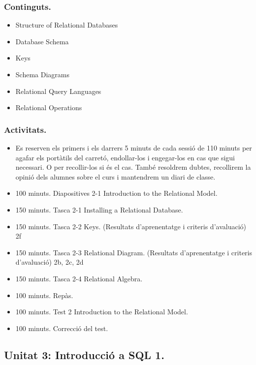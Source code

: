 \documentclass[catalan, a4paper, 12pt, titlepage]{article}
\begin{document}
  \subsubsection{Continguts.}

  \begin{itemize}
	  \item Structure of Relational Databases
	  \item Database Schema
	  \item Keys
	  \item Schema Diagrams
	  \item Relational Query Languages
	  \item Relational Operations
  \end{itemize}

  \subsubsection{Activitats.}

  \begin{itemize}
          \item Es reserven els primers i els darrers 5 minuts de cada sessió de 110 minuts per agafar els portàtils del carretó, endollar-los i engegar-los en cas que sigui necessari. O per recollir-los si és el cas. També resoldrem dubtes, recollirem la opinió dels alumnes sobre el curs i mantendrem un diari de classe.
          \item 100 minuts. Diapositives 2-1 Introduction to the Relational Model.
	  \item 150 minuts. Tasca 2-1 Installing a Relational Database.
	  \item 150 minuts. Tasca 2-2 Keys. (\faGraduationCap Resultats d'aprenentatge i criteris d'avaluació) 2f
	  \item 150 minuts. Tasca 2-3 Relational Diagram. (\faGraduationCap Resultats d'aprenentatge i criteris d'avaluació) 2b, 2c, 2d
	  \item 150 minuts. Tasca 2-4 Relational Algebra.
	  \item 100 minuts. Repàs.
	  \item 100 minuts. Test 2 Introduction to the Relational Model.
	  \item 100 minuts. Correcció del test.
  \end{itemize}

  \subsection{Unitat 3: Introducció a SQL 1.}
\end{document}
